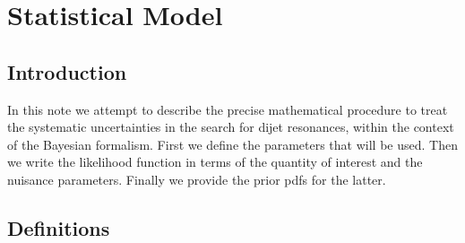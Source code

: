 \section{Statistical Model}
  \label{appStatModel}
  \subsection{Introduction}
  In this note we attempt to describe the precise mathematical procedure to treat the systematic uncertainties in the search for dijet resonances, within the context of the Bayesian formalism. First we define the parameters that will be used. Then we write the likelihood function in terms of the quantity of interest and the nuisance parameters. Finally we provide the prior pdfs for the latter.  
  \subsection{Definitions}
